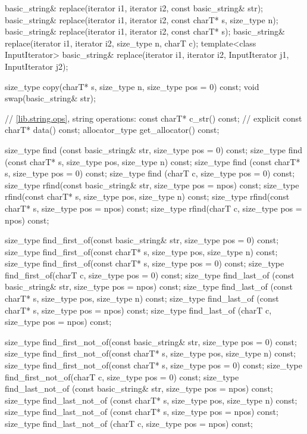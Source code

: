\begin{codeblock}
{{    basic_string& replace(iterator i1, iterator i2,
                          const basic_string& str);
    basic_string& replace(iterator i1, iterator i2, const charT* s,
                          size_type n);
    basic_string& replace(iterator i1, iterator i2, const charT* s);
    basic_string& replace(iterator i1, iterator i2,
                          size_type n, charT c);
    template<class InputIterator>
      basic_string& replace(iterator i1, iterator i2,
                            InputIterator j1, InputIterator j2);

    size_type copy(charT* s, size_type n, size_type pos = 0) const;
    void swap(basic_string& str);

    // \ref{lib.string.ops}, string operations:
    const charT* c_str() const;         // explicit
    const charT* data() const;
    allocator_type get_allocator() const;

    size_type find (const basic_string& str, size_type pos = 0) const;
    size_type find (const charT* s, size_type pos, size_type n) const;
    size_type find (const charT* s, size_type pos = 0) const;
    size_type find (charT c, size_type pos = 0) const;
    size_type rfind(const basic_string& str, size_type pos = npos) const;
    size_type rfind(const charT* s, size_type pos, size_type n) const;
    size_type rfind(const charT* s, size_type pos = npos) const;
    size_type rfind(charT c, size_type pos = npos) const;

    size_type find_first_of(const basic_string& str,
                            size_type pos = 0) const;
    size_type find_first_of(const charT* s,
                            size_type pos, size_type n) const;
    size_type find_first_of(const charT* s, size_type pos = 0) const;
    size_type find_first_of(charT c, size_type pos = 0) const;
    size_type find_last_of (const basic_string& str,
                            size_type pos = npos) const;
    size_type find_last_of (const charT* s,
                            size_type pos, size_type n) const;
    size_type find_last_of (const charT* s, size_type pos = npos) const;
    size_type find_last_of (charT c, size_type pos = npos) const;

    size_type find_first_not_of(const basic_string& str,
                                size_type pos = 0) const;
    size_type find_first_not_of(const charT* s, size_type pos,
                                size_type n) const;
    size_type find_first_not_of(const charT* s, size_type pos = 0) const;
    size_type find_first_not_of(charT c, size_type pos = 0) const;
    size_type find_last_not_of (const basic_string& str,
                                size_type pos = npos) const;
    size_type find_last_not_of (const charT* s, size_type pos,
                                size_type n) const;
    size_type find_last_not_of (const charT* s,
                                size_type pos = npos) const;
    size_type find_last_not_of (charT c, size_type pos = npos) const;

}}
\end{codeblock}
